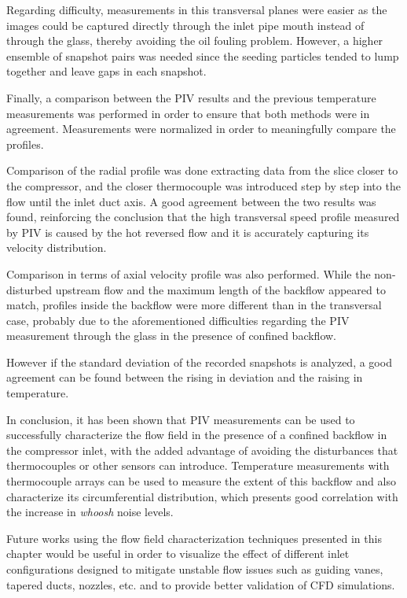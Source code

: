 Regarding difficulty, measurements in this transversal planes were easier as the images could be captured directly through the inlet pipe mouth instead of through the glass, thereby avoiding the oil fouling problem. However, a higher ensemble of snapshot pairs was needed since the seeding particles tended to lump together and leave gaps in each snapshot.

Finally, a comparison between the PIV results and the previous temperature measurements was performed in order to ensure that both methods were in agreement. Measurements were normalized in order to meaningfully compare the profiles.

Comparison of the radial profile was done extracting data from the slice closer to the compressor, and the closer thermocouple was introduced step by step into the flow until the inlet duct axis. A good agreement between the two results was found, reinforcing the conclusion that the high transversal speed profile measured by PIV is caused by the hot reversed flow and it is accurately capturing its velocity distribution.

Comparison in terms of axial velocity profile was also performed. While the non-disturbed upstream flow and the maximum length of the backflow appeared to match, profiles inside the backflow were more different than in the transversal case, probably due to the aforementioned difficulties regarding the PIV measurement through the glass in the presence of confined backflow.

However if the standard deviation of the recorded snapshots is analyzed, a good agreement can be found between the rising in deviation and the raising in temperature.

In conclusion, it has been shown that PIV measurements can be used to successfully characterize the flow field in the presence of a confined backflow in the compressor inlet, with the added advantage of avoiding the disturbances that thermocouples or other sensors can introduce. Temperature measurements with thermocouple arrays can be used to measure the extent of this backflow and also characterize its circumferential distribution, which presents good correlation with the increase in \emph{whoosh} noise levels.

Future works using the flow field characterization techniques presented in this chapter would be useful in order to visualize the effect of different inlet configurations designed to mitigate unstable flow issues such as guiding vanes, tapered ducts, nozzles, etc. and to provide better validation of CFD simulations.
